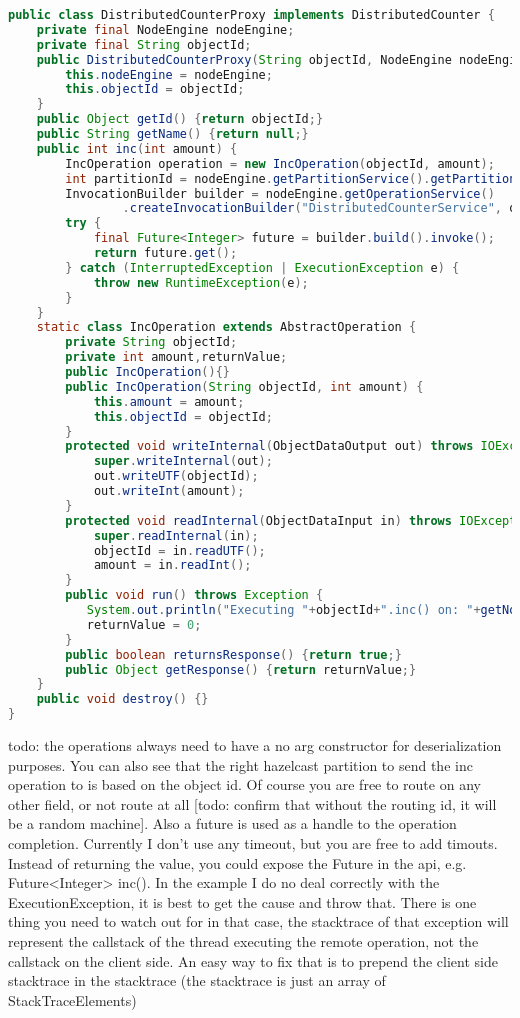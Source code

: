 \begin{lstlisting}[language=java]
public class DistributedCounterProxy implements DistributedCounter {
    private final NodeEngine nodeEngine;
    private final String objectId;
    public DistributedCounterProxy(String objectId, NodeEngine nodeEngine) {
        this.nodeEngine = nodeEngine;
        this.objectId = objectId;
    }
    public Object getId() {return objectId;}
    public String getName() {return null;}
    public int inc(int amount) {
        IncOperation operation = new IncOperation(objectId, amount);
        int partitionId = nodeEngine.getPartitionService().getPartitionId(objectId);
        InvocationBuilder builder = nodeEngine.getOperationService()
                .createInvocationBuilder("DistributedCounterService", operation, partitionId);
        try {
            final Future<Integer> future = builder.build().invoke();
            return future.get();
        } catch (InterruptedException | ExecutionException e) {
            throw new RuntimeException(e);
        }
    }
    static class IncOperation extends AbstractOperation {
        private String objectId;
        private int amount,returnValue;
        public IncOperation(){}
        public IncOperation(String objectId, int amount) {
            this.amount = amount;
            this.objectId = objectId;
        }
        protected void writeInternal(ObjectDataOutput out) throws IOException {
            super.writeInternal(out);
            out.writeUTF(objectId);
            out.writeInt(amount);
        }
        protected void readInternal(ObjectDataInput in) throws IOException {
            super.readInternal(in);
            objectId = in.readUTF();
            amount = in.readInt();
        }
        public void run() throws Exception {
           System.out.println("Executing "+objectId+".inc() on: "+getNodeEngine().getThisAddress());            
           returnValue = 0;
        }
        public boolean returnsResponse() {return true;}
        public Object getResponse() {return returnValue;}
    }
    public void destroy() {}
}
\end{lstlisting}
todo: the operations always need to have a no arg constructor for deserialization purposes. You can also see that the right hazelcast partition to send the inc operation to is based on the object id. Of course you are free to route on any other field, or not route at all [todo: confirm that without the routing id, it will be a random machine]. Also a future is used as a handle to the operation completion. Currently I don't use any timeout, but you are free to add timouts. Instead of returning the value, you could expose the Future in the api, e.g. Future<Integer> inc(). In the example I do no deal correctly with the ExecutionException, it is best to get the cause and throw that. There is one thing you need to watch out for in that case, the stacktrace of that exception will represent the callstack of the thread executing the remote operation, not the callstack on the client side. An easy way to fix that is to prepend  the client side stacktrace in the stacktrace (the stacktrace is just an array of StackTraceElements)

